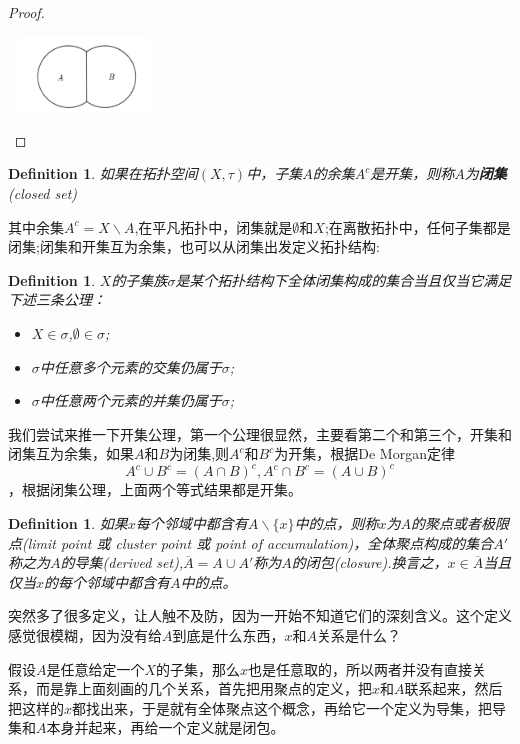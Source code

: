 \documentclass{article}
\newtheorem{definition}[theorem]{Definition}
\begin{document}
\begin{proof}
\begin{enumerate}
	\begin{center}
		\includegraphics[width=4cm, height=2cm]{images/A_B_same_border.png}
	\end{center}	
\end{enumerate}
\end{proof}

\begin{definition}
如果在拓扑空间$(X,\tau)$中，子集$A$的余集$A^{c}$是开集，则称$A$为\textbf{闭集}(closed set)
\end{definition}

其中余集$A^{c}= X \smallsetminus A$,在平凡拓扑中，闭集就是$\emptyset$和$X$;在离散拓扑中，任何子集都是闭集;闭集和开集互为余集，也可以从闭集出发定义拓扑结构:

\begin{definition}
$X$的子集族$\sigma$是某个拓扑结构下全体闭集构成的集合当且仅当它满足下述三条公理：
\begin{itemize}
	\item $X \in \sigma$,$\emptyset \in \sigma$;
	\item $\sigma$中任意多个元素的交集仍属于$\sigma$;
	\item $\sigma$中任意两个元素的并集仍属于$\sigma$;
\end{itemize}
\end{definition}

我们尝试来推一下开集公理，第一个公理很显然，主要看第二个和第三个，开集和闭集互为余集，如果$A$和$B$为闭集,则$A^c$和$B^c$为开集，根据De Morgan定律\[A^c \cup B^c = (A \cap B)^c , A^c \cap B^c = (A \cup B)^c\]，根据闭集公理，上面两个等式结果都是开集。

\begin{definition}
如果$x$每个邻域中都含有$A \smallsetminus \{x\}$中的点，则称$x$为$A$的聚点或者极限点(limit point 或 cluster point 或 point of accumulation)，全体聚点构成的集合$A'$称之为$A$的导集(derived set),$\overline{A}=A \cup A'$称为$A$的闭包(closure).换言之，$x \in \overline{A}$当且仅当$x$的每个邻域中都含有$A$中的点。
\end{definition}

突然多了很多定义，让人触不及防，因为一开始不知道它们的深刻含义。这个定义感觉很模糊，因为没有给$A$到底是什么东西，$x$和$A$关系是什么？

假设$A$是任意给定一个$X$的子集，那么$x$也是任意取的，所以两者并没有直接关系，而是靠上面刻画的几个关系，首先把用聚点的定义，把$x$和$A$联系起来，然后把这样的$x$都找出来，于是就有全体聚点这个概念，再给它一个定义为导集，把导集和$A$本身并起来，再给一个定义就是闭包。
\end{document}
